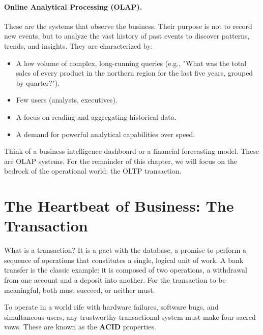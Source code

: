 \documentclass[12pt,a4paper]{article}
\begin{document}
\paragraph{Online Analytical Processing (OLAP).} These are the systems that observe the business. Their purpose is not to record new events, but to analyze the vast history of past events to discover patterns, trends, and insights. They are characterized by:
\begin{itemize}
    \item A low volume of complex, long-running queries (e.g., "What was the total sales of every product in the northern region for the last five years, grouped by quarter?").
    \item Few users (analysts, executives).
    \item A focus on reading and aggregating historical data.
    \item A demand for powerful analytical capabilities over speed.
\end{itemize}
Think of a business intelligence dashboard or a financial forecasting model. These are OLAP systems. For the remainder of this chapter, we will focus on the bedrock of the operational world: the OLTP transaction.

\section{The Heartbeat of Business: The Transaction}

What is a transaction? It is a pact with the database, a promise to perform a sequence of operations that constitutes a single, logical unit of work. A bank transfer is the classic example: it is composed of two operations, a withdrawal from one account and a deposit into another. For the transaction to be meaningful, both must succeed, or neither must.

To operate in a world rife with hardware failures, software bugs, and simultaneous users, any trustworthy transactional system must make four sacred vows. These are known as the \textbf{ACID} properties.
\end{document}
